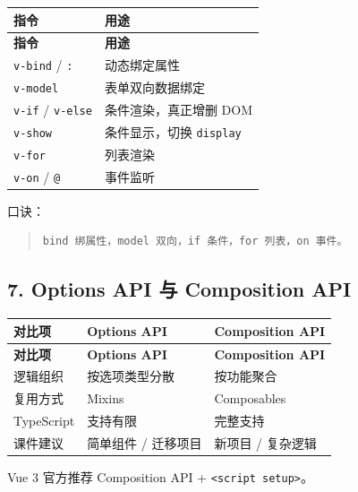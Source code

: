 \documentclass[UTF8,zihao=-4]{ctexart}
\begin{document}
{
\footnotesize
\begin{longtable}{|>{\raggedright\arraybackslash}p{}|>{\raggedright\arraybackslash}p{}|}
\hline
\textbf{指令} & \textbf{用途} \\
\hline
\endfirsthead
\hline
\textbf{指令} & \textbf{用途} \\
\hline
\endhead
\texttt{v-bind} / \texttt{:} & 动态绑定属性 \\
\hline
\texttt{v-model} & 表单双向数据绑定 \\
\hline
\texttt{v-if} / \texttt{v-else} & 条件渲染，真正增删 DOM \\
\hline
\texttt{v-show} & 条件显示，切换 \texttt{display} \\
\hline
\texttt{v-for} & 列表渲染 \\
\hline
\texttt{v-on} / \texttt{@} & 事件监听 \\
\hline
\end{longtable}
}


口诀：

\begin{quote}
\footnotesize
\begin{verbatim}
bind 绑属性，model 双向，if 条件，for 列表，on 事件。
\end{verbatim}
\end{quote}

\subsection{7. Options API 与 Composition API}

{
\footnotesize
\begin{longtable}{|>{\raggedright\arraybackslash}p{}|>{\raggedright\arraybackslash}p{}|>{\raggedright\arraybackslash}p{}|}
\hline
\textbf{对比项} & \textbf{Options API} & \textbf{Composition API} \\
\hline
\endfirsthead
\hline
\textbf{对比项} & \textbf{Options API} & \textbf{Composition API} \\
\hline
\endhead
逻辑组织 & 按选项类型分散 & 按功能聚合 \\
\hline
复用方式 & Mixins & Composables \\
\hline
TypeScript & 支持有限 & 完整支持 \\
\hline
课件建议 & 简单组件 / 迁移项目 & 新项目 / 复杂逻辑 \\
\hline
\end{longtable}
}


Vue 3 官方推荐 Composition API + \texttt{<script setup>}。
\end{document}
